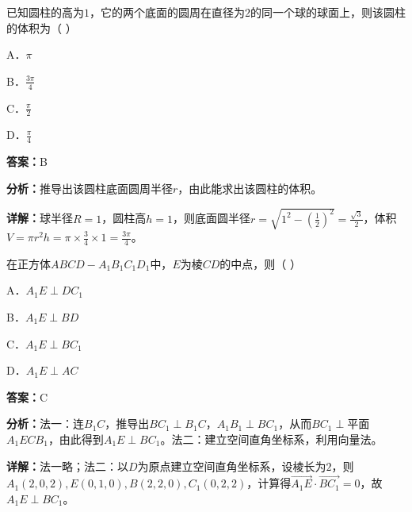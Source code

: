 \begin{question}[points=5]
已知圆柱的高为$1$，它的两个底面的圆周在直径为$2$的同一个球的球面上，则该圆柱的体积为（            ）
\begin{choices}
  \item A．$\pi$
  \item B．$\frac{3\pi}{4}$
  \item C．$\frac{\pi}{2}$
  \item D．$\frac{\pi}{4}$
\end{choices}
\begin{solution}
\textbf{答案：}B

\textbf{分析：}推导出该圆柱底面圆周半径$r$，由此能求出该圆柱的体积。

\textbf{详解：}球半径$R=1$，圆柱高$h=1$，则底面圆半径$r=\sqrt{1^2-(\frac{1}{2})^2}=\frac{\sqrt{3}}{2}$，体积$V=\pi r^2 h=\pi\times\frac{3}{4}\times1=\frac{3\pi}{4}$。
\end{solution}
\end{question}

\begin{question}[points=5]
在正方体$ABCD-A_1B_1C_1D_1$中，$E$为棱$CD$的中点，则（      ）
\begin{choices}
  \item A．$A_1E\perp DC_1$
  \item B．$A_1E\perp BD$
  \item C．$A_1E\perp BC_1$
  \item D．$A_1E\perp AC$
\end{choices}
\begin{solution}
\textbf{答案：}C

\textbf{分析：}法一：连$B_1C$，推导出$BC_1\perp B_1C$，$A_1B_1\perp BC_1$，从而$BC_1\perp$平面$A_1ECB_1$，由此得到$A_1E\perp BC_1$。法二：建立空间直角坐标系，利用向量法。

\textbf{详解：}法一略；法二：以$D$为原点建立空间直角坐标系，设棱长为$2$，则$A_1(2,0,2),E(0,1,0),B(2,2,0),C_1(0,2,2)$，计算得$\overrightarrow{A_1E}\cdot\overrightarrow{BC_1}=0$，故$A_1E\perp BC_1$。
\end{solution}
\end{question}

